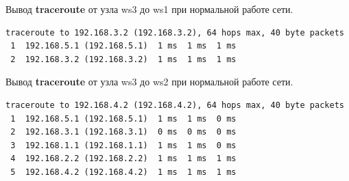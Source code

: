 \documentclass[a4paper,12pt]{article}
\begin{document}
Вывод \textbf{traceroute} от узла ws3 до ws1 при нормальной работе сети.

\begin{Verbatim}
traceroute to 192.168.3.2 (192.168.3.2), 64 hops max, 40 byte packets
 1  192.168.5.1 (192.168.5.1)  1 ms  1 ms  1 ms
 2  192.168.3.2 (192.168.3.2)  1 ms  1 ms  1 ms
\end{Verbatim}
Вывод \textbf{traceroute} от узла ws3 до ws2 при нормальной работе сети.

\begin{Verbatim}
traceroute to 192.168.4.2 (192.168.4.2), 64 hops max, 40 byte packets
 1  192.168.5.1 (192.168.5.1)  1 ms  1 ms  0 ms
 2  192.168.3.1 (192.168.3.1)  0 ms  0 ms  0 ms
 3  192.168.1.1 (192.168.1.1)  1 ms  1 ms  0 ms
 4  192.168.2.2 (192.168.2.2)  1 ms  1 ms  1 ms
 5  192.168.4.2 (192.168.4.2)  1 ms  1 ms  1 ms
\end{Verbatim}
\end{document}
